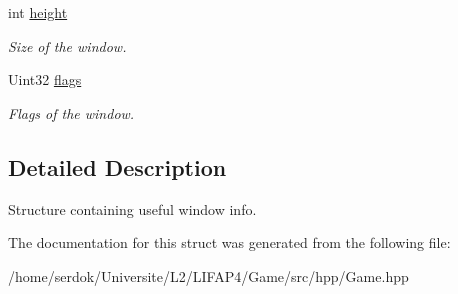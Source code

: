 \begin{DoxyCompactItemize}
\mbox{\label{structSDL__WindowInfo_abb321b367d4221fac50b8d10f03283c2}} 
int \hyperlink{structSDL__WindowInfo_abb321b367d4221fac50b8d10f03283c2}{height}
\begin{DoxyCompactList}\small\item\em Size of the window. \end{DoxyCompactList}\item 
\mbox{\label{structSDL__WindowInfo_a54b7260c4504d9cc2dbe3a910811171c}} 
Uint32 \hyperlink{structSDL__WindowInfo_a54b7260c4504d9cc2dbe3a910811171c}{flags}
\begin{DoxyCompactList}\small\item\em Flags of the window. \end{DoxyCompactList}\end{DoxyCompactItemize}


\subsection{Detailed Description}
Structure containing useful window info. 

The documentation for this struct was generated from the following file\+:\begin{DoxyCompactItemize}
\item 
/home/serdok/\+Universite/\+L2/\+L\+I\+F\+A\+P4/\+Game/src/hpp/Game.\+hpp\end{DoxyCompactItemize}
